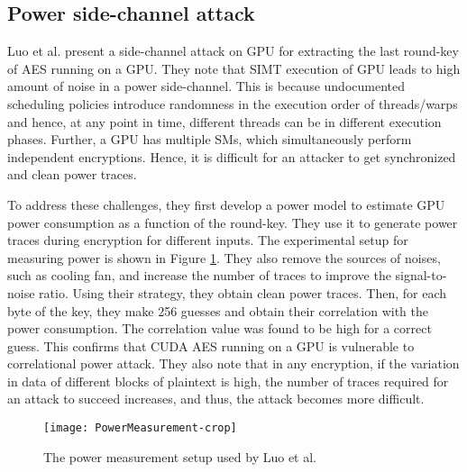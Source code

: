 \subsection{Power side-channel attack}
    
Luo et al. \cite{luo2015side} present a side-channel attack on GPU for extracting the last round-key of AES running on a GPU. They note that SIMT execution of GPU leads to high amount of noise in a power side-channel. This is because undocumented scheduling policies introduce randomness in the execution order of threads/warps and hence, at any point in time, different threads can be in different execution phases. Further, a GPU has multiple SMs, which simultaneously perform independent encryptions. Hence, it is difficult for an attacker to get synchronized and clean power traces. 
 
To address these challenges, they first develop a power model to estimate GPU power consumption as a function of the round-key. They use it to generate power traces during encryption for different inputs. The experimental setup for measuring power is shown in Figure \ref{fig:PowerSideChannel}. They also remove the sources of noises, such as cooling fan, and increase the number of traces to improve the signal-to-noise ratio. Using their strategy, they obtain clean power traces. Then, for each byte of the key, they make 256 guesses and obtain their correlation with the power consumption. The correlation value was found to be high for a correct guess. This confirms that  CUDA AES running on a GPU is vulnerable to correlational power attack. They also note that in any encryption, if the variation in data of different blocks of plaintext is high, the number of traces required for an attack to succeed increases, and thus, the attack becomes more difficult. 
  
   
 
\begin{figure} [htbp]
\centering
\texttt{[image: PowerMeasurement-crop]}
\caption{ The power measurement setup used by Luo et al. \cite{luo2015side} }\label{fig:PowerSideChannel}
\end{figure}
 
